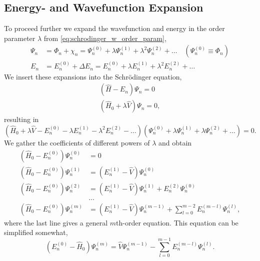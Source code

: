\subsection{Energy- and Wavefunction Expansion}
To proceed further we expand the wavefunction and energy in the order parameter 
$\lambda$ from \autoref{eq:schrodinger_w_order_param},
\begin{equation}
    \begin{aligned}
        \Psi_n &= \Phi_n + \chi_n = \Psi_n^{(0)} + \lambda\Psi_n^{(1)} 
            + \lambda^2\Psi_n^{(2)} + \dots \quad (\Psi_n^{(0)} \equiv \Phi_n) \\
        E_n &= E_n^{(0)} + \Delta E_n = E_n^{(0)} + \lambda E_n^{(1)} 
            + \lambda^2 E_n^{(2)} + \dots 
    \end{aligned}
\end{equation}
We insert these expansions into the Schrödinger equation,
\begin{equation}
    \begin{aligned}
        (\hat{H} - E_n) \Psi_n = 0 \\
        (\hat{H}_0 + \lambda \hat{V})\Psi_n = 0,
    \end{aligned}
\end{equation}
resulting in 
\begin{equation}
    (\hat{H}_0 + \lambda \hat{V} - E_n^{(0)} - \lambda E_n^{(1)} 
        -\lambda^2 E_n^{(2)} - \dots)
    (\Psi_n^{(0)} + \lambda \Psi_n^{(1)} + \lambda \Psi_n^{(2)} + \dots) = 0.
\end{equation}
We gather the coefficients of different powers of $\lambda$ and obtain
\begin{align}
    (\hat{H}_0 - E_n^{(0)})\Psi_n^{(0)} &= 0 \\
    \label{eq:perturbation_lambda_power_first}
    (\hat{H}_0 - E_n^{(0)})\Psi_n^{(1)} &= (E_n^{(1)} - \hat{V})\Psi_n^{(0)}  \\
    (\hat{H}_0 - E_n^{(0)})\Psi_n^{(2)} &= (E_n^{(1)} - \hat{V})\Psi_n^{(1)}
        + E_n^{(2)}\Psi_n^{(0)} \\
        &\dots \nonumber \\
    \label{eq:perturbation_lambda_power_mth}
    (\hat{H}_0 - E_n^{(0)})\Psi_n^{(m)} &= (E_n^{(1)} - \hat{V})\Psi_n^{(m-1)}
        + \sum_{l=0}^{m-2} E_n^{(m-l)}\Psi_n^{(l)},
\end{align}
where the last line gives a general $m$th-order equation. This equation can be 
simplified somewhat,
\begin{equation}
    (E_n^{(0)} - \hat{H}_0)\Psi_n^{(m)} = \hat{V}\Psi_n^{(m-1)} 
        - \sum_{l=0}^{m-1}E_n^{(m-l)}\Psi_n^{(l)}.
\end{equation}

